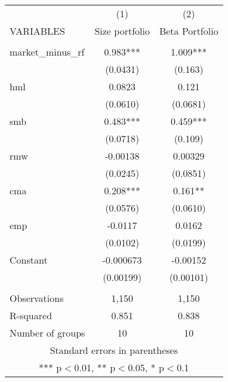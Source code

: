 \begin{tabular}{lcc} \hline
 & (1) & (2) \\
VARIABLES & Size portfolio & Beta Portfolio \\ \hline
 &  &  \\
market\_minus\_rf & 0.983*** & 1.009*** \\
 & (0.0431) & (0.163) \\
hml & 0.0823 & 0.121 \\
 & (0.0610) & (0.0681) \\
smb & 0.483*** & 0.459*** \\
 & (0.0718) & (0.109) \\
rmw & -0.00138 & 0.00329 \\
 & (0.0245) & (0.0851) \\
cma & 0.208*** & 0.161** \\
 & (0.0576) & (0.0610) \\
emp & -0.0117 & 0.0162 \\
 & (0.0102) & (0.0199) \\
Constant & -0.000673 & -0.00152 \\
 & (0.00199) & (0.00101) \\
 &  &  \\
Observations & 1,150 & 1,150 \\
R-squared & 0.851 & 0.838 \\
 Number of groups & 10 & 10 \\ \hline
\multicolumn{3}{c}{ Standard errors in parentheses} \\
\multicolumn{3}{c}{ *** p$<$0.01, ** p$<$0.05, * p$<$0.1} \\
\end{tabular}
